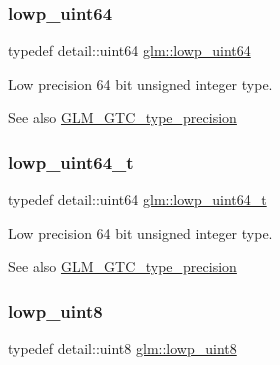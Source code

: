 \subsubsection{\texorpdfstring{lowp\+\_\+uint64}{lowp\_uint64}}
{\footnotesize\ttfamily typedef detail\+::uint64 \hyperlink{group__gtc__type__precision_gacf666a9d9b309c4615c7a4f2ab0be289}{glm\+::lowp\+\_\+uint64}}

Low precision 64 bit unsigned integer type. \begin{DoxySeeAlso}{See also}
\hyperlink{group__gtc__type__precision}{G\+L\+M\+\_\+\+G\+T\+C\+\_\+type\+\_\+precision} 
\end{DoxySeeAlso}
\mbox{\label{group__gtc__type__precision_gabf3069d4f188557a87b1d7f35eb0a270}} 
\subsubsection{\texorpdfstring{lowp\+\_\+uint64\+\_\+t}{lowp\_uint64\_t}}
{\footnotesize\ttfamily typedef detail\+::uint64 \hyperlink{group__gtc__type__precision_gabf3069d4f188557a87b1d7f35eb0a270}{glm\+::lowp\+\_\+uint64\+\_\+t}}

Low precision 64 bit unsigned integer type. \begin{DoxySeeAlso}{See also}
\hyperlink{group__gtc__type__precision}{G\+L\+M\+\_\+\+G\+T\+C\+\_\+type\+\_\+precision} 
\end{DoxySeeAlso}
\mbox{\label{group__gtc__type__precision_ga4d9dc08b7b248a386dfe9afd00fc6b1e}} 
\subsubsection{\texorpdfstring{lowp\+\_\+uint8}{lowp\_uint8}}
{\footnotesize\ttfamily typedef detail\+::uint8 \hyperlink{group__gtc__type__precision_ga4d9dc08b7b248a386dfe9afd00fc6b1e}{glm\+::lowp\+\_\+uint8}}

